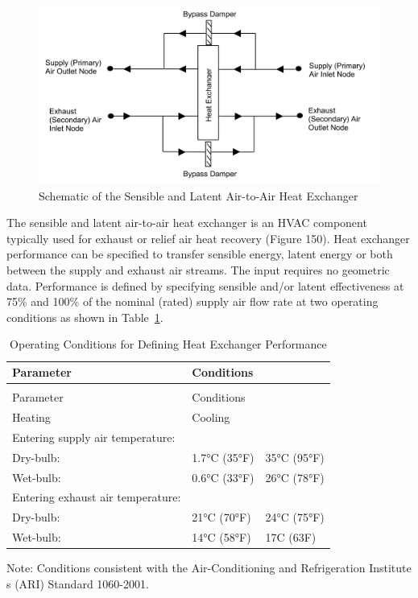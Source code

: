 \begin{figure}[htbp]
\centering
\includegraphics{media/image423.png}
\caption{Schematic of the Sensible and Latent Air-to-Air Heat Exchanger}
\end{figure}

The sensible and latent air-to-air heat exchanger is an HVAC component typically used for exhaust or relief air heat recovery (Figure 150). Heat exchanger performance can be specified to transfer sensible energy, latent energy or both between the supply and exhaust air streams. The input requires no geometric data. Performance is defined by specifying sensible and/or latent effectiveness at 75\% and 100\% of the nominal (rated) supply air flow rate at two operating conditions as shown in Table~\ref{table:operating-conditions-for-defining-heat}.

\begin{longtable}[c]{@{}lll@{}}
\caption{Operating Conditions for Defining Heat Exchanger Performance \label{table:operating-conditions-for-defining-heat}} \tabularnewline
\toprule
Parameter & Conditions & \tabularnewline
\midrule
\endfirsthead

\caption[]{Operating Conditions for Defining Heat Exchanger Performance} \tabularnewline
\toprule
Parameter & Conditions & \tabularnewline
\midrule
\endhead

Heating & Cooling & \tabularnewline
Entering supply air temperature: &  &  \tabularnewline
Dry-bulb: & 1.7°C (35°F) & 35°C (95°F) \tabularnewline
Wet-bulb: & 0.6°C (33°F) & 26°C (78°F) \tabularnewline
Entering exhaust air temperature: &  &  \tabularnewline
Dry-bulb: & 21°C (70°F) & 24°C (75°F) \tabularnewline
Wet-bulb: & 14°C (58°F) & 17C (63F) \tabularnewline
\bottomrule
\end{longtable}

Note: Conditions consistent with the Air-Conditioning and Refrigeration Institute s (ARI) Standard 1060-2001.

